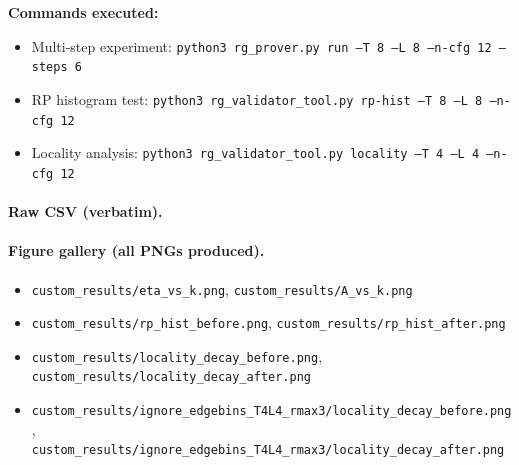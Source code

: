 \documentclass[11pt]{article}
\begin{document}
\textbf{Commands executed:}
\begin{itemize}
\item Multi-step experiment: \texttt{python3 rg\_prover.py run --T 8 --L 8 --n-cfg 12 --steps 6}
\item RP histogram test: \texttt{python3 rg\_validator\_tool.py rp-hist --T 8 --L 8 --n-cfg 12}
\item Locality analysis: \texttt{python3 rg\_validator\_tool.py locality --T 4 --L 4 --n-cfg 12}
\end{itemize}

\paragraph{Raw CSV (verbatim).}

\paragraph{Figure gallery (all PNGs produced).}
\begin{itemize}
  \item \texttt{custom\_results/eta\_vs\_k.png}, \texttt{custom\_results/A\_vs\_k.png}
  \item \texttt{custom\_results/rp\_hist\_before.png}, \texttt{custom\_results/rp\_hist\_after.png}
  \item \texttt{custom\_results/locality\_decay\_before.png}, \texttt{custom\_results/locality\_decay\_after.png}
  \item \texttt{custom\_results/ignore\_edgebins\_T4L4\_rmax3/locality\_decay\_before.png},\\
        \texttt{custom\_results/ignore\_edgebins\_T4L4\_rmax3/locality\_decay\_after.png}
\end{itemize}
\end{document}
